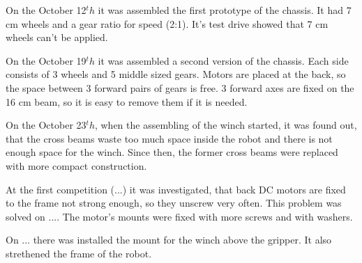 \begin{enumerate*}
    On the October 12$^th$ it was assembled the first prototype of the chassis. It had 7 cm wheels and a gear ratio for speed (2:1). It's test drive showed that 7 cm wheels can't be applied. 
    
    On the October 19$^th$ it was assembled a second version of the chassis. Each side consists of 3 wheels and 5 middle sized gears. Motors are placed at the back, so the space between 3 forward pairs of gears is free. 3 forward axes are fixed on the 16 cm beam, so it is easy to remove them if it is needed. 
    
    On the October 23$^th$, when the assembling of the winch started, it was found out, that the cross beams waste too much space inside the robot and there is not enough space for the winch. Since then, the former cross beams were replaced with more compact construction.
    
    At the first competition (...) it was investigated, that back DC motors are fixed to the frame not strong enough, so they unscrew very often. This problem was solved on .... The motor's mounts were fixed with more screws and with washers. 
    
    On ... there was installed the mount for the winch above the gripper. It also strethened the frame of the robot.
  
  \end{enumerate*}
  
  \fillpage